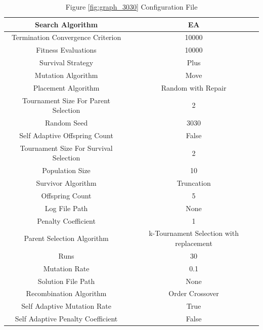 \documentclass{standalone}
\begin{document}
\begin{table}[!htb]
	\centering
	\caption{Figure \ref{fig:graph_3030} Configuration File}
	\label{tab:graph_3030}
	\begin{tabular}{| c | c |}
		\hline
		Search Algorithm		& EA		 \\
		\hline
		Termination Convergence Criterion		& 10000		 \\
		\hline
		Fitness Evaluations		& 10000		 \\
		\hline
		Survival Strategy		& Plus		 \\
		\hline
		Mutation Algorithm		& Move		 \\
		\hline
		Placement Algorithm		& Random with Repair		 \\
		\hline
		Tournament Size For Parent Selection		& 2		 \\
		\hline
		Random Seed		& 3030		 \\
		\hline
		Self Adaptive Offspring Count		& False		 \\
		\hline
		Tournament Size For Survival Selection		& 2		 \\
		\hline
		Population Size		& 10		 \\
		\hline
		Survivor Algorithm		& Truncation		 \\
		\hline
		Offspring Count		& 5		 \\
		\hline
		Log File Path		& None		 \\
		\hline
		Penalty Coefficient		& 1		 \\
		\hline
		Parent Selection Algorithm		& k-Tournament Selection with replacement		 \\
		\hline
		Runs		& 30		 \\
		\hline
		Mutation Rate		& 0.1		 \\
		\hline
		Solution File Path		& None		 \\
		\hline
		Recombination Algorithm		& Order Crossover		 \\
		\hline
		Self Adaptive Mutation Rate		& True		 \\
		\hline
		Self Adaptive Penalty Coefficient		& False		 \\
		\hline
	\end{tabular}
\end{table}
\end{document}
